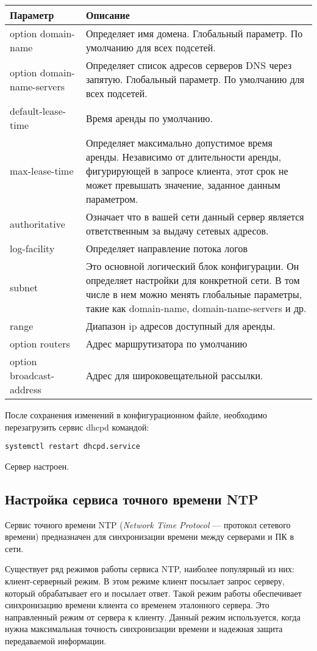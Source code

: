 \documentclass[a4paper,10pt,twoside]{article}
\begin{document}
\begin{longtable}{  m{5cm}  m{12cm}  }  
 \textbf{Параметр} & \textbf{Описание}\\\hline
 option domain-name & Определяет имя домена. Глобальный параметр. По умолчанию для всех подсетей.\\
 option domain-name-servers & Определяет список адресов серверов DNS через запятую. Глобальный параметр. По умолчанию для всех подсетей.\\
 default-lease-time & Время аренды по умолчанию.\\
max-lease-time & Определяет максимально допустимое время аренды. Независимо от длительности аренды, фигурирующей в запросе клиента, этот срок не может превышать значение, заданное данным параметром.\\
authoritative & Означает что в вашей сети данный сервер является ответственным за выдачу сетевых адресов.\\
log-facility & Определяет направление потока логов\\
subnet & Это основной логический блок конфигурации. Он определяет настройки для конкретной сети. В том числе в нем можно менять глобальные параметры, такие как domain-name, domain-name-servers и др.\\
range & Диапазон ip адресов доступный для аренды.\\
option routers & Адрес маршрутизатора по умолчанию\\
option broadcast-address & Адрес для широковещательной рассылки.\\
\end{longtable}

После сохранения изменений в конфигурационном файле, необходимо перезагрузить сервис dhcpd командой:

\begin{verbatim}
systemctl restart dhcpd.service
\end{verbatim} 

Сервер настроен.


\subsection{Настройка сервиса точного времени NTP}
Сервис точного времени NTP (\textit{Network Time Protocol} — протокол сетевого времени) предназначен для синхронизации времени между серверами и ПК в сети.

Существует ряд режимов работы сервиса NTP, наиболее популярный из них: клиент-серверный режим. В этом режиме клиент посылает запрос серверу, который обрабатывает его и посылает ответ. Такой режим работы обеспечивает синхронизацию времени клиента со временем эталонного сервера. Это направленный режим от сервера к клиенту. Данный режим  используется, когда нужна максимальная точность синхронизации времени и надежная защита передаваемой информации.
\end{document}
